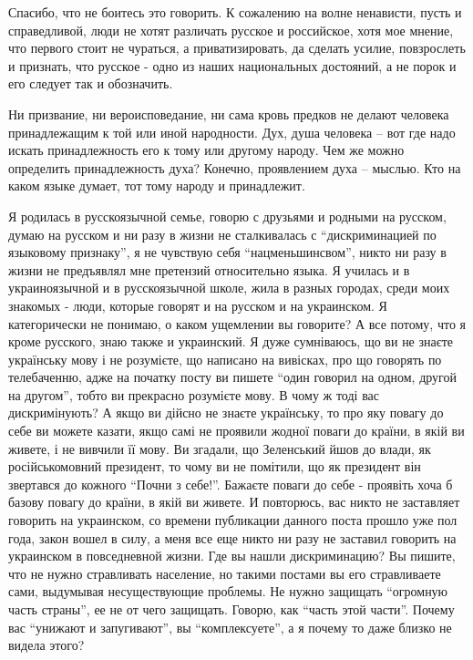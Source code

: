 
Спасибо, что не боитесь это говорить. К сожалению на волне ненависти, пусть и
справедливой, люди не хотят различать русское и российское, хотя мое мнение,
что первого стоит не чураться, а приватизировать, да сделать усилие,
повзрослеть и признать, что русское - одно из наших национальных достояний, а
не порок и его следует так и обозначить.


Ни призвание, ни вероисповедание, ни сама кровь предков не делают человека
принадлежащим к той или иной народности. Дух, душа человека – вот где надо
искать принадлежность его к тому или другому народу. Чем же можно определить
принадлежность духа? Конечно, проявлением духа – мыслью. Кто на каком языке
думает, тот тому народу и принадлежит.


Я родилась в русскоязычной семье, говорю с друзьями и родными на русском, думаю
на русском и ни разу в жизни не сталкивалась с \enquote{дискриминацией по языковому
признаку}, я не чувствую себя \enquote{нацменьшинсвом}, никто ни разу в жизни не
предъявлял мне претензий относительно языка. Я училась и в украиноязычной и в
русскоязычной школе, жила в разных городах, среди моих знакомых - люди, которые
говорят и на русском и на украинском. Я категорически не понимаю, о каком
ущемлении вы говорите? А все потому, что я кроме русского, знаю также и
украинский. Я дуже сумніваюсь, що ви не знаєте українську мову і не розумієте,
що написано на вивісках, про що говорять по телебаченню, адже на початку посту
ви пишете \enquote{один говорил на одном, другой на другом}, тобто ви прекрасно
розумієте мову. В чому ж тоді вас дискримінують? А якщо ви дійсно не знаєте
українську, то про яку повагу до себе ви можете казати, якщо самі не проявили
жодної поваги до країни, в якій ви живете, і не вивчили її мову. Ви згадали, що
Зеленський йшов до влади, як російськомовний президент, то чому ви не помітили,
що як президент він звертався до кожного \enquote{Почни з себе!}. Бажаєте поваги до
себе - проявіть хоча б базову повагу до країни, в якій ви живете. И повторюсь,
вас никто не заставляет говорить на украинском, со времени публикации данного
поста прошло уже пол года, закон вошел в силу, а меня все еще никто ни разу не
заставил говорить на украинском в повседневной жизни. Где вы нашли
дискриминацию? Вы пишите, что не нужно стравливать население, но такими постами
вы его стравливаете сами, выдумывая несуществующие проблемы. Не нужно защищать
\enquote{огромную часть страны}, ее не от чего защищать. Говорю, как \enquote{часть этой
части}. Почему вас \enquote{унижают и запугивают}, вы \enquote{комплексуете}, а я почему то
даже близко не видела этого?

